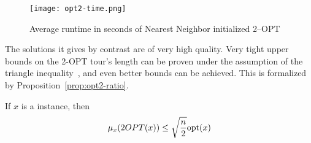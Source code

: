 \begin{figure}
    \begin{center}
        \texttt{[image: opt2-time.png]}
    \end{center}
    \caption{Average runtime in seconds of Nearest Neighbor initialized 2--OPT}
    \label{fig:2-opt-time}
\end{figure}

The solutions it gives by contrast are of very high quality. Very tight upper bounds on the 2-OPT tour's length can be proven under the assumption of the triangle inequality~\cite{opt2-ratio}, and even better bounds can be achieved. This is formalized by Proposition~\ref{prop:opt2-ratio}.

\begin{proposition}
    \label{prop:opt2-ratio}
    If \(x\) is a \TSP{} instance, then \[\mu_x(2OPT(x))\le \sqrt{n\over 2} \mathrm{opt}(x)\]
\end{proposition}